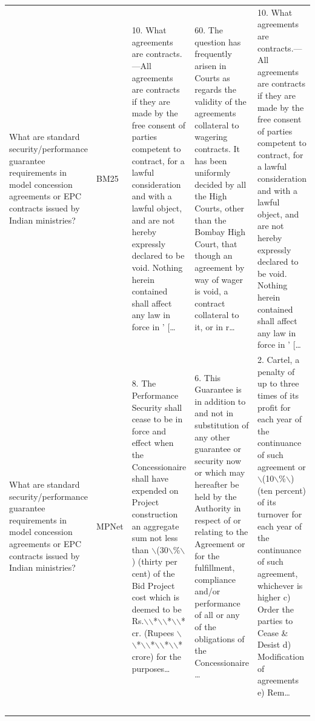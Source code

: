 \documentclass[11pt]{article}
\begin{document}
\begin{xltabular}{\textwidth}{|p{3.2cm}|p{2.2cm}|Y|Y|Y|}
        What are standard security/performance guarantee requirements in model concession agreements or EPC contracts issued by Indian ministries? & BM25 & 10. What agreements are contracts.—All agreements are contracts if they are made by the free consent of parties competent to contract, for a lawful consideration and with a lawful object, and are not hereby expressly declared to be void. Nothing herein contained shall affect any law in force in ' [… & 60. The question has frequently arisen in Courts as regards the validity of the agreements collateral to wagering contracts. It has been uniformly decided by all the High Courts, other than the Bombay High Court, that though an agreement by way of wager is void, a contract collateral to it, or in r… & 10. What agreements are contracts.—All agreements are contracts if they are made by the free consent of parties competent to contract, for a lawful consideration and with a lawful object, and are not hereby expressly declared to be void. Nothing herein contained shall affect any law in force in ' [… \\ 
        What are standard security/performance guarantee requirements in model concession agreements or EPC contracts issued by Indian ministries? & MPNet & 8. The Performance Security shall cease to be in force and effect when the Concessionaire shall have expended on Project construction an aggregate sum not less than $\backslash$(30$\backslash$\%$\backslash$) (thirty per cent) of the Bid Project cost which is deemed to be Rs.$\backslash$$\backslash$*$\backslash$$\backslash$*$\backslash$$\backslash$* cr. (Rupees $\backslash$$\backslash$*$\backslash$$\backslash$*$\backslash$$\backslash$*$\backslash$$\backslash$* crore) for the purposes… & 6. This Guarantee is in addition to and not in substitution of any other guarantee or security now or which may hereafter be held by the Authority in respect of or relating to the Agreement or for the fulfillment, compliance and/or performance of all or any of the obligations of the Concessionaire … & 2. Cartel, a penalty of up to three times of its profit for each year of the continuance of such agreement or $\backslash$(10$\backslash$\%$\backslash$) (ten percent) of its turnover for each year of the continuance of such agreement, whichever is higher  c) Order the parties to Cease \& Desist  d) Modification of agreements  e) Rem… \\ 
$$
\end{xltabular}
\end{document}
